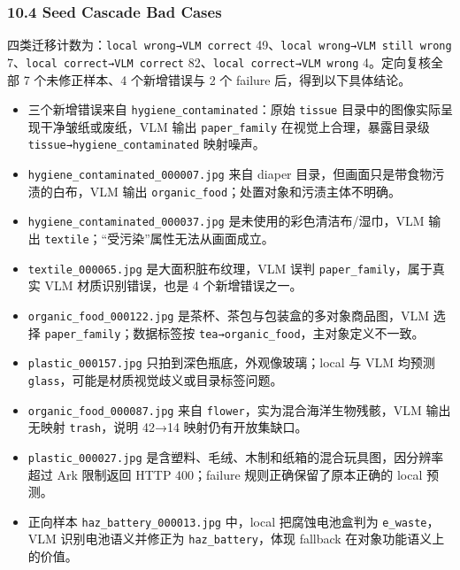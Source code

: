 \documentclass[
  a4paper,
]{article}
\providecommand{\tightlist}{%
  \setlength{\itemsep}{0pt}\setlength{\parskip}{0pt}}
\begin{document}
\hypertarget{104-seed-cascade-bad-cases}{%
\subsubsection{10.4 Seed Cascade Bad
Cases}\label{104-seed-cascade-bad-cases}}

四类迁移计数为：\texttt{local\ wrong→VLM\ correct}
49、\texttt{local\ wrong→VLM\ still\ wrong}
7、\texttt{local\ correct→VLM\ correct}
82、\texttt{local\ correct→VLM\ wrong} 4。定向复核全部 7 个未修正样本、4
个新增错误与 2 个 failure 后，得到以下具体结论。

\begin{itemize}
\tightlist
\item
  三个新增错误来自 \texttt{hygiene\_contaminated}：原始 \texttt{tissue}
  目录中的图像实际呈现干净皱纸或废纸，VLM 输出 \texttt{paper\_family}
  在视觉上合理，暴露目录级 \texttt{tissue→hygiene\_contaminated}
  映射噪声。
\item
  \texttt{hygiene\_contaminated\_000007.jpg} 来自 diaper
  目录，但画面只是带食物污渍的白布，VLM 输出
  \texttt{organic\_food}；处置对象和污渍主体不明确。
\item
  \texttt{hygiene\_contaminated\_000037.jpg}
  是未使用的彩色清洁布/湿巾，VLM 输出
  \texttt{textile}；``受污染''属性无法从画面成立。
\item
  \texttt{textile\_000065.jpg} 是大面积脏布纹理，VLM 误判
  \texttt{paper\_family}，属于真实 VLM 材质识别错误，也是 4
  个新增错误之一。
\item
  \texttt{organic\_food\_000122.jpg}
  是茶杯、茶包与包装盒的多对象商品图，VLM 选择
  \texttt{paper\_family}；数据标签按
  \texttt{tea→organic\_food}，主对象定义不一致。
\item
  \texttt{plastic\_000157.jpg} 只拍到深色瓶底，外观像玻璃；local 与 VLM
  均预测 \texttt{glass}，可能是材质视觉歧义或目录标签问题。
\item
  \texttt{organic\_food\_000087.jpg} 来自
  \texttt{flower}，实为混合海洋生物残骸，VLM 输出无映射
  \texttt{trash}，说明 42→14 映射仍有开放集缺口。
\item
  \texttt{plastic\_000027.jpg}
  是含塑料、毛绒、木制和纸箱的混合玩具图，因分辨率超过 Ark 限制返回 HTTP
  400；failure 规则正确保留了原本正确的 local 预测。
\item
  正向样本 \texttt{haz\_battery\_000013.jpg} 中，local 把腐蚀电池盒判为
  \texttt{e\_waste}，VLM 识别电池语义并修正为
  \texttt{haz\_battery}，体现 fallback 在对象功能语义上的价值。
\end{itemize}
\end{document}
